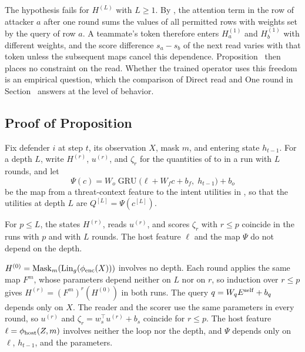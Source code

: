 The hypothesis fails for $H^{(L)}$ with $L\ge1$. By , the attention term in the row of attacker $a$ after one round sums the values of all permitted rows with weights set by the query of row $a$. A teammate's token therefore enters $H^{(1)}_a$ and $H^{(1)}_b$ with different weights, and the score difference $s_a-s_b$ of the next read varies with that token unless the subsequent maps cancel this dependence. Proposition~ then places no constraint on the read. Whether the trained operator uses this freedom is an empirical question, which the comparison of Direct read and One round in Section~ answers at the level of behavior.

\subsection{\texorpdfstring{Proof of Proposition~}{Proof of Proposition 2}}
\label{sec:s-proof-prefix}
Fix defender $i$ at step $t$, its observation $X$, mask $m$, and entering state $h_{t-1}$. For a depth $L$, write $H^{(r)}$, $u^{(r)}$, and $\zeta_r$ for the quantities of  to  in a run with $L$ rounds, and let
\begin{equation}
\Psi(c)=W_o\operatorname{GRU}\big(\ell+W_fc+b_f,\;h_{t-1}\big)+b_o
\label{eq:s-decision-map}
\end{equation}
be the map from a threat-context feature to the intent utilities in , so that the utilities at depth $L$ are $Q^{[L]}=\Psi(c^{[L]})$.

\begin{lemma}
\label{lem:s-prefix}
For $p\le L$, the states $H^{(r)}$, reads $u^{(r)}$, and scores $\zeta_r$ with $r\le p$ coincide in the runs with $p$ and with $L$ rounds. The host feature $\ell$ and the map $\Psi$ do not depend on the depth.
\end{lemma}

\begin{IEEEproof}
$H^{(0)}=\operatorname{Mask}_m(\operatorname{Lin}_g(\phi_{\rm enc}(X)))$ involves no depth. Each round applies the same map $F^{m}$, whose parameters depend neither on $L$ nor on $r$, so induction over $r\le p$ gives $H^{(r)}=(F^m)^{r}(H^{(0)})$ in both runs. The query $q=W_qE^{\rm self}+b_q$ depends only on $X$. The reader and the scorer use the same parameters in every round, so $u^{(r)}$ and $\zeta_r=w_s^\top u^{(r)}+b_s$ coincide for $r\le p$. The host feature $\ell=\phi_{\rm host}(Z,m)$ involves neither the loop nor the depth, and $\Psi$ depends only on $\ell$, $h_{t-1}$, and the parameters.
\end{IEEEproof}

